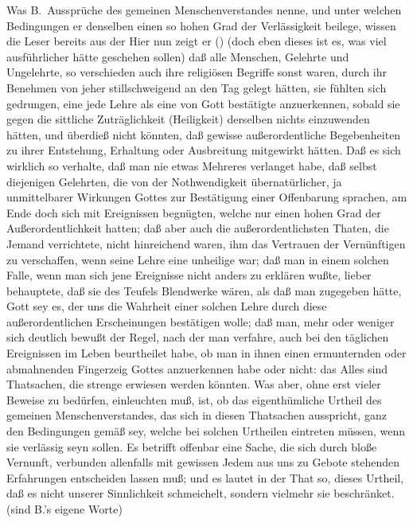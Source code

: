 Was B.\ Aussprüche des gemeinen Menschenverstandes nenne, und unter welchen Bedingungen er denselben einen so hohen Grad der Verlässigkeit beilege, wissen die Leser bereits aus der  Hier nun zeigt er () (doch eben dieses ist es, was viel ausführlicher hätte geschehen sollen) daß alle Menschen, Gelehrte und Ungelehrte, so verschieden auch ihre religiösen Begriffe sonst waren, durch ihr Benehmen von jeher stillschweigend an den Tag gelegt hätten, sie fühlten sich gedrungen, eine jede Lehre als eine von Gott bestätigte anzuerkennen, sobald sie gegen die sittliche Zuträglichkeit (Heiligkeit) derselben nichts einzuwenden hätten, und überdieß nicht  könnten, daß gewisse außerordentliche Begebenheiten zu ihrer Entstehung, Erhaltung oder Ausbreitung mitgewirkt hätten. Daß es sich wirklich so verhalte, daß man nie etwas Mehreres verlanget habe, daß selbst diejenigen Gelehrten, die von der Nothwendigkeit übernatürlicher, ja unmittelbarer Wirkungen Gottes zur Bestätigung einer Offenbarung sprachen, am Ende doch sich mit Ereignissen begnügten, welche nur einen hohen Grad der Außerordentlichkeit hatten; daß aber auch die außerordentlichsten Thaten, die Jemand verrichtete, nicht hinreichend waren, ihm das Vertrauen der Vernünftigen zu verschaffen, wenn seine Lehre eine unheilige war; daß man in einem solchen Falle, wenn man sich jene Ereignisse nicht anders zu erklären wußte, lieber behauptete, daß sie des Teufels Blendwerke wären, als daß man zugegeben hätte, Gott sey es, der uns die Wahrheit einer solchen Lehre durch diese außerordentlichen Erscheinungen bestätigen wolle; daß man, mehr oder weniger sich deutlich bewußt der Regel, nach der man verfahre, auch bei den täglichen Ereignissen im Leben beurtheilet habe, ob man in ihnen einen ermunternden oder abmahnenden Fingerzeig Gottes anzuerkennen habe oder nicht: das Alles sind Thatsachen, die strenge erwiesen werden könnten. Was aber, ohne erst vieler Beweise zu bedürfen, einleuchten muß, ist, ob das eigenthümliche Urtheil des gemeinen Menschenverstandes, das sich in diesen Thatsachen ausspricht, ganz den Bedingungen gemäß  sey, welche bei solchen Urtheilen eintreten müssen, wenn sie verlässig seyn sollen. Es betrifft offenbar eine Sache, die sich durch bloße Vernunft, verbunden allenfalls mit gewissen Jedem aus uns zu Gebote stehenden Erfahrungen entscheiden lassen muß; und es lautet in der That so, dieses Urtheil, daß es nicht unserer Sinnlichkeit schmeichelt, sondern vielmehr sie beschränket.  (sind B.'s eigene Worte)  \par
